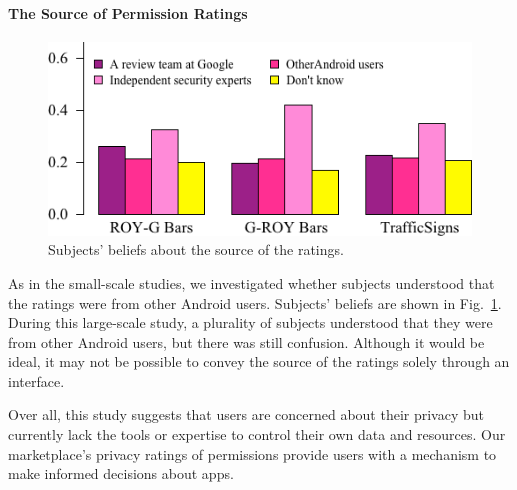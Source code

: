 \documentclass[11pt]{article}
\begin{document}
\paragraph{The Source of Permission Ratings}
\label{s-source}

\begin{figure}
\begin{center}
\includegraphics[width=.9\linewidth]{graphs/SourceBeliefs.png}
    \caption{Subjects' beliefs about the source of the ratings.}
    \label{src-beliefs}
    \end{center}
\end{figure}

As in the small-scale studies, we investigated whether subjects understood 
that the ratings were from other Android users. Subjects' beliefs are shown 
in Fig.~\ref{src-beliefs}.
During 
this large-scale study, a plurality of subjects understood that they were from other 
Android users, but there was still confusion. 
Although it would be ideal, it may not be possible to convey the 
source of the ratings solely through an interface. 


Over all, this study suggests that users are 
concerned about their privacy but currently lack the tools 
or expertise to control their own data and resources. Our 
marketplace's privacy ratings of permissions provide users
with a mechanism to make informed decisions about apps.
\end{document}
